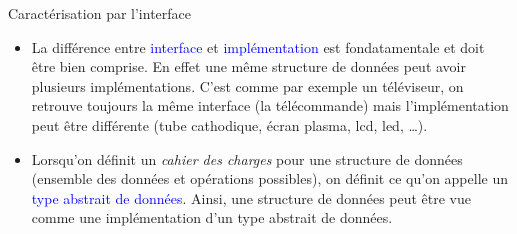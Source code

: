 \documentclass[10pt]{beamer}
\begin{document}
\begin{frame}{\SL}
	\mframe{\SL}
	\begin{alertblock}{Caractérisation par l'interface}
		\begin{itemize}[label=\textbullet]
			\item<1-> La différence entre \textcolor{blue}{interface} et \textcolor{blue}{implémentation} est fondatamentale et doit être bien comprise. En effet une même structure de données peut avoir plusieurs implémentations. C'est comme par exemple un téléviseur, on retrouve toujours la même interface (la télécommande) mais l'implémentation peut être différente (tube cathodique, écran plasma, lcd, led, \dots).
			\item<2-> Lorsqu'on définit un \textit{cahier des charges} pour une structure de données (ensemble des données et opérations possibles), on définit ce qu'on appelle un \textcolor{blue}{type abstrait de données}.  Ainsi, une structure de données peut être vue comme une implémentation d'un type abstrait de données.
		\end{itemize}
	\end{alertblock}
\end{frame}
\end{document}
